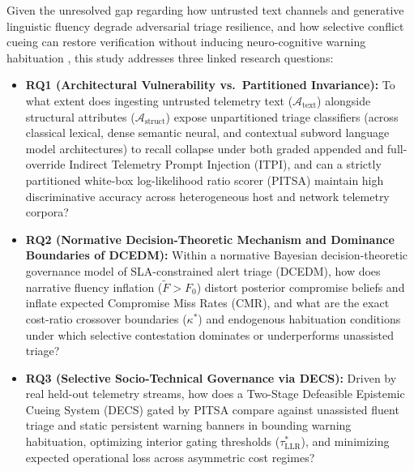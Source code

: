 \documentclass[11pt,a4paper]{article}
\begin{document}
Given the unresolved gap regarding how untrusted text channels and generative linguistic fluency degrade adversarial triage resilience, and how selective conflict cueing can restore verification without inducing neuro-cognitive warning habituation \citep{anderson2016warning, vance2018fog, jensen2022improving}, this study addresses three linked research questions:
\begin{itemize}
  \item \textbf{RQ1 (Architectural Vulnerability vs.\ Partitioned Invariance):} To what extent does ingesting untrusted telemetry text ($\mathcal{A}_{\text{text}}$) alongside structural attributes ($\mathcal{A}_{\text{struct}}$) expose unpartitioned triage classifiers (across classical lexical, dense semantic neural, and contextual subword language model architectures) to recall collapse under both graded appended and full-override Indirect Telemetry Prompt Injection (ITPI), and can a strictly partitioned white-box log-likelihood ratio scorer (PITSA) maintain high discriminative accuracy across heterogeneous host and network telemetry corpora?
  \item \textbf{RQ2 (Normative Decision-Theoretic Mechanism and Dominance Boundaries of DCEDM):} Within a normative Bayesian decision-theoretic governance model of SLA-constrained alert triage (DCEDM), how does narrative fluency inflation ($\tilde{F} > F_0$) distort posterior compromise beliefs and inflate expected Compromise Miss Rates (CMR), and what are the exact cost-ratio crossover boundaries ($\kappa^*$) and endogenous habituation conditions under which selective contestation dominates or underperforms unassisted triage?
  \item \textbf{RQ3 (Selective Socio-Technical Governance via DECS):} Driven by real held-out telemetry streams, how does a Two-Stage Defeasible Epistemic Cueing System (DECS) gated by PITSA compare against unassisted fluent triage and static persistent warning banners in bounding warning habituation, optimizing interior gating thresholds ($\tau^*_{\text{LLR}}$), and minimizing expected operational loss across asymmetric cost regimes?
\end{itemize}
\end{document}
